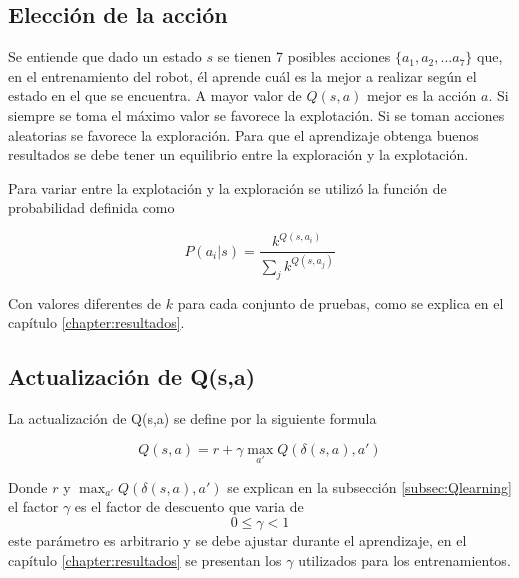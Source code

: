 \subsection{Elecci\'on de la acci\'on}\label{subsec:eleccionAccion}

Se entiende que dado un estado $s$ se tienen 7 posibles acciones $\{a_1, a_2, ... a_7\}$ que, en el entrenamiento del robot, él aprende cuál es la mejor a realizar según el estado en el que se encuentra. A mayor valor de $Q(s,a)$ mejor es la acción $a$. Si siempre se toma el máximo valor se favorece la explotación. Si se toman acciones aleatorias se favorece la exploración. Para que el aprendizaje obtenga buenos resultados se debe tener un equilibrio entre la exploración y la explotación. 

Para variar entre la explotación y la exploración se utiliz\'o la función de probabilidad definida como  %


\begin{equation}
 P(a_{i} | s) = \dfrac{k^{Q(s,a_{i})}}{\sum_{j}k^{Q(s,a_{j})}}
\end{equation}

Con valores diferentes de $k$ para cada conjunto de pruebas, como se explica en el capítulo \ref{chapter:resultados}.  
 
 
\subsection{Actualizaci\'on de Q(s,a)}

La actualizaci\'on de Q(s,a) se define por la siguiente formula 
 
\begin{equation}
Q (s,a) = r + {\gamma\max_{a'}} Q(\delta(s ,a ) , a') 
\end{equation} 



Donde $r$ y $\max_{a'} Q(\delta(s,a),a')$ se explican en la subsecci\'on \ref{subsec:Qlearning} el factor $\gamma$ es el factor de descuento que varia de \[   0 \leq  \gamma < 1 \] este par\'ametro es arbitrario y se debe ajustar durante el aprendizaje, en el cap\'itulo \ref{chapter:resultados}  se presentan los $\gamma$ utilizados para los entrenamientos.
